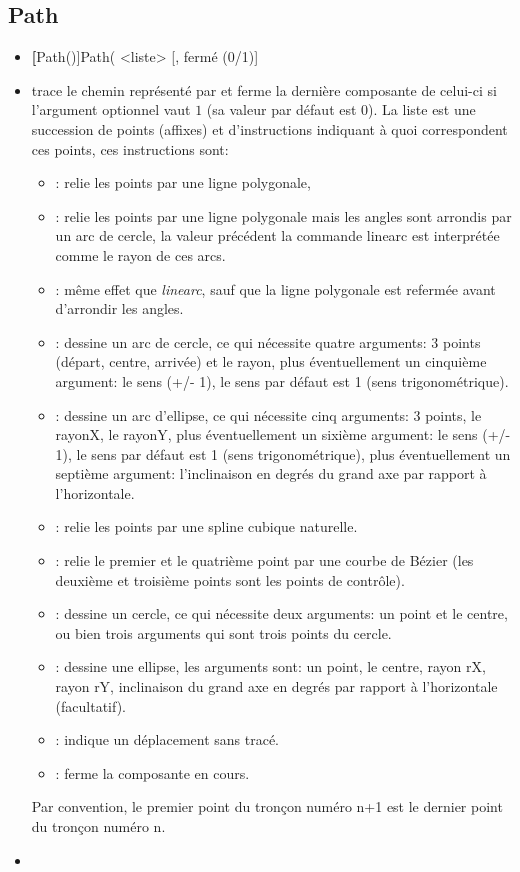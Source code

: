 \subsection{Path}\label{cmdPath}
\begin{itemize}
 \item \util  \textbf[Path()]{Path( <liste> [, fermé (0/1)]}
 \item \desc trace le chemin représenté par  et ferme la dernière composante de celui-ci si l'argument optionnel vaut $1$ (sa valeur par défaut est $0$). La liste est une succession de points (affixes) et d'instructions indiquant à quoi correspondent ces points, ces instructions sont: 
\begin{itemize}
 \item {}: relie les points par une ligne polygonale,
 \item {}: relie les points par une ligne polygonale mais les angles sont arrondis par un arc de cercle, la valeur précédent la commande linearc est interprétée comme le rayon de ces arcs.
 \item {}: même effet que \emph{linearc}, sauf que la ligne polygonale est refermée avant d'arrondir les angles.
 \item {}: dessine un arc de cercle, ce qui nécessite quatre arguments: 3 points (départ, centre, arrivée) et le rayon, plus éventuellement un cinquième argument: le sens (+/- 1), le sens par défaut est 1 (sens trigonométrique).
 \item {}: dessine un arc d'ellipse, ce qui nécessite cinq arguments: 3 points, le rayonX, le rayonY, plus éventuellement un sixième argument: le sens (+/- 1), le sens par défaut est 1 (sens trigonométrique), plus éventuellement un septième argument: l'inclinaison en degrés du grand axe par rapport à l'horizontale.
 \item {}: relie les points par une spline cubique naturelle.
 \item {}: relie le premier et le quatrième point par une courbe de Bézier (les deuxième et troisième points sont les points de contrôle).
 \item {}: dessine un cercle, ce qui nécessite deux arguments: un point et le centre, ou bien trois arguments qui sont trois points du cercle.
 \item {}: dessine une ellipse, les arguments sont: un point, le centre, rayon rX, rayon rY, inclinaison du grand axe en degrés par rapport à l'horizontale (facultatif).
 \item {}: indique un déplacement sans tracé.
 \item {}: ferme la composante en cours.
\end{itemize}
Par convention, le premier point du tronçon numéro n+1 est le dernier point du tronçon numéro n.
 \item \exem
\end{itemize}

